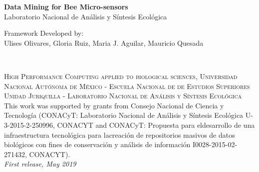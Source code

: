 \documentclass[11pt,fleqn]{book} %
\begin{document}

\begingroup
\thispagestyle{empty}
\centering
\vspace*{4cm}
\par\normalfont\fontsize{35}{35}\sffamily\selectfont
\textbf{\color{white}Data Mining for Bee Micro-sensors}\\
{\Huge\color{white} Laboratorio Nacional de Análisis y Síntesis Ecológica}\par %
\vspace*{0.2cm}
{\LARGE\color{white} Framework Developed by:\\ Ulises Olivares, Gloria Ruiz, Maria J. Aguilar,  Mauricio Quesada }\par 
\endgroup


\newpage
~\vfill
\thispagestyle{empty}


\noindent \textsc{High Performance Computing applied to biological sciences, Universidad Nacional Autónoma de México - Escuela Nacional de de Estudios Superiores Unidad Juriquilla - Laboratorio Nacional de Análisis y Síntesis Ecológica}\\

\noindent  This work was supported by grants from Consejo Nacional de Ciencia y Tecnología (CONACyT: Laboratorio Nacional de Análisis y Síntesis Ecológica U-3-2015-2-250996, CONACYT and CONACyT: Propuesta para eldesarrollo de una infraestructura tecnológica para lacreación de repositorios masivos de datos biológicos con fines de conservación y análisis de información I0028-2015-02-271432, CONACYT).\\ %

\noindent \textit{First release, May 2019} %
\end{document}
